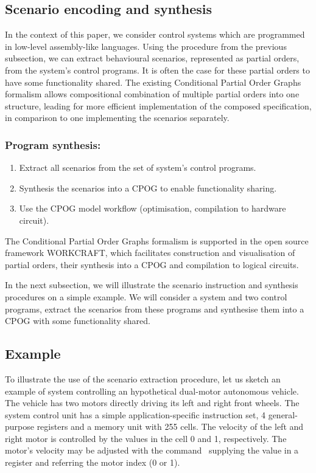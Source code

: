 \subsection{Scenario encoding and synthesis}

In the context of this paper, we consider control systems which are programmed
in low-level assembly-like languages. Using the procedure from the previous subsection,
we can extract behavioural scenarios, represented as partial orders, from the
system's control programs. It is often the case for these partial orders to have
some functionality shared. The existing Conditional Partial Order Graphs
formalism allows compositional combination of multiple partial orders into one
structure, leading for more efficient implementation of the composed
specification, in comparison to one implementing the scenarios separately.

\subsubsection{Program synthesis:}
\begin{enumerate}
    \item Extract all scenarios from the set of system's control programs.
    \item Synthesis the scenarios into a CPOG to enable functionality sharing.
    \item Use the CPOG model workflow (optimisation, compilation to hardware circuit).
\end{enumerate}

The Conditional Partial Order Graphs formalism is supported in the open source
framework WORKCRAFT, which facilitates construction and visualisation of partial
orders, their synthesis into a CPOG and compilation to logical circuits.

In the next subsection, we will illustrate the scenario instruction and
synthesis procedures on a simple example. We will consider a system and two
control programs, extract the scenarios from these programs and synthesise them
into a CPOG with some functionality shared.

\subsection{Example}

To illustrate the use of the scenario extraction procedure, let us sketch an
example of system controlling an hypothetical dual-motor autonomous vehicle.
The vehicle has two motors directly driving its left and right front wheels.
The system control unit has a simple application-specific instruction set, 4
general-purpose registers and a memory unit with 255 cells. The velocity of the
left and right motor is controlled by the values in the cell 0 and 1, respectively.
The motor's velocity may be adjusted with the command~
supplying the value in a register and referring the motor index (0 or 1).

